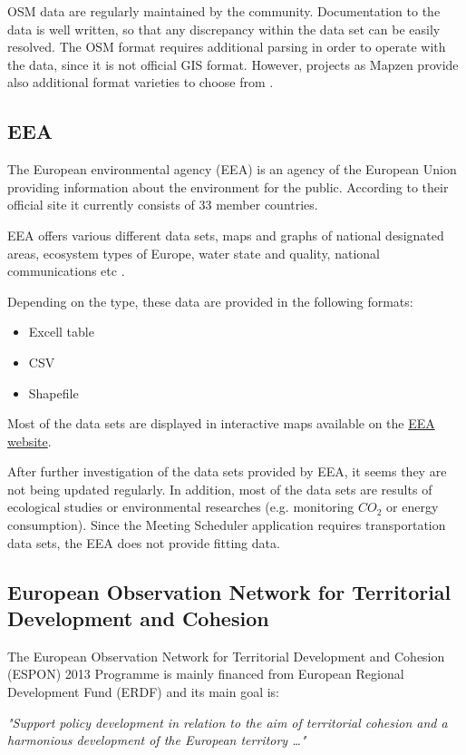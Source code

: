 \documentclass[thesis=M,english]{FITthesis}[2012/10/20]
\begin{document}
OSM data are regularly maintained by the community. Documentation to the data is well written, so that any discrepancy within the data set can be easily resolved. The OSM format requires additional parsing in order to operate with the data, since it is not official GIS format. However, projects as Mapzen provide also additional format varieties to choose from \cite{Mapzen17}.

\subsection{EEA}
The European environmental agency (EEA) is an agency of the European Union providing information about the environment for the public. According to their official site \cite{EEA16} it currently consists of 33 member countries.

EEA offers various different data sets, maps and graphs of national designated areas, ecosystem types of Europe, water state and quality, national communications etc \cite{EEA16}.

Depending on the type, these data are provided in the following formats:
\begin{itemize}
\item Excell table
\item CSV
\item Shapefile
\end{itemize} 

Most of the data sets are displayed in interactive maps available on the \href{http://www.eea.europa.eu/data-and-maps}{EEA website}.

After further investigation of the data sets provided by EEA, it seems they are not being updated regularly. In addition, most of the data sets are results of ecological studies or environmental researches (e.g. monitoring $CO_{2}$ or energy consumption)\cite{EEA16}. Since the Meeting Scheduler application requires transportation data sets, the EEA does not provide fitting data.

\subsection{European Observation Network for Territorial Development and Cohesion}
The European Observation Network for Territorial Development and Cohesion (ESPON) 2013 Programme is mainly financed from European Regional Development Fund (ERDF) and its main goal is:

\textit{"Support policy development in relation to the aim of territorial cohesion and a harmonious development of the European territory \ldots "} \cite{ESPON13}
\end{document}
